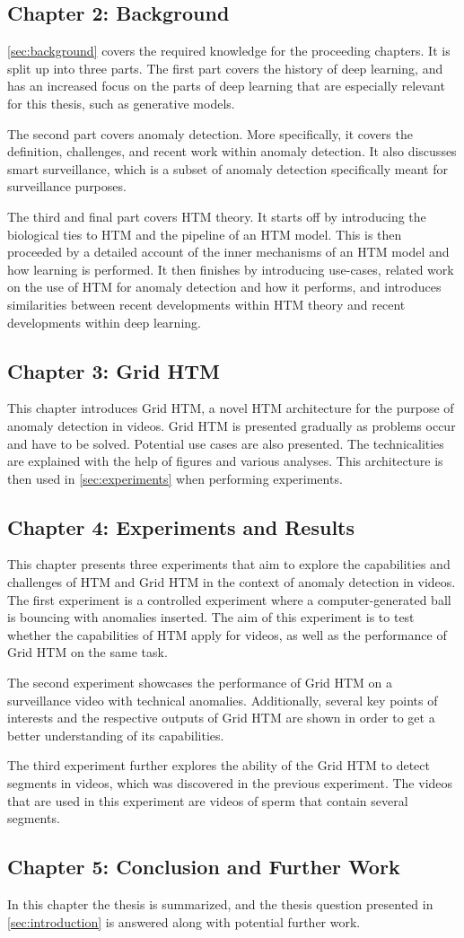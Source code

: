 \subsection*{Chapter 2: Background}
\autoref{sec:background} covers the required knowledge for the proceeding chapters. It is split up into three parts. The first part covers the history of deep learning, and has an increased focus on the parts of deep learning that are especially relevant for this thesis, such as generative models.
\par
The second part covers anomaly detection. More specifically, it covers the definition, challenges, and recent work within anomaly detection. It also discusses smart surveillance, which is a subset of anomaly detection specifically meant for surveillance purposes.
\par
The third and final part covers HTM theory. It starts off by introducing the biological ties to HTM and the pipeline of an HTM model. This is then proceeded by a detailed account of the inner mechanisms of an HTM model and how learning is performed. It then finishes by introducing use-cases, related work on the use of HTM for anomaly detection and how it performs, and introduces similarities between recent developments within HTM theory and recent developments within deep learning.
\subsection*{Chapter 3: Grid HTM}
This chapter introduces Grid HTM, a novel HTM architecture for the purpose of anomaly detection in videos. Grid HTM is presented gradually as problems occur and have to be solved. Potential use cases are also presented. The technicalities are explained with the help of figures and various analyses. This architecture is then used in \autoref{sec:experiments} when performing experiments.
\subsection*{Chapter 4: Experiments and Results}
This chapter presents three experiments that aim to explore the capabilities and challenges of HTM and Grid HTM in the context of anomaly detection in videos. The first experiment is a controlled experiment where a computer-generated ball is bouncing with anomalies inserted. The aim of this experiment is to test whether the capabilities of HTM apply for videos, as well as the performance of Grid HTM on the same task.
\par
The second experiment showcases the performance of Grid HTM on a surveillance video with technical anomalies. Additionally, several key points of interests and the respective outputs of Grid HTM are shown in order to get a better understanding of its capabilities.
\par
The third experiment further explores the ability of the Grid HTM to detect segments in videos, which was discovered in the previous experiment. The videos that are used in this experiment are videos of sperm that contain several segments.
\subsection*{Chapter 5: Conclusion and Further Work}
In this chapter the thesis is summarized, and the thesis question presented in \autoref{sec:introduction} is answered along with potential further work.